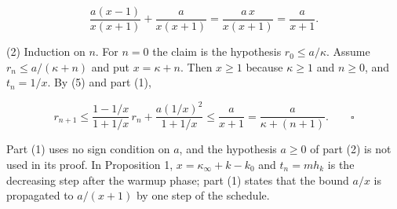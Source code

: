\documentclass[11pt,a4paper]{report}
\begin{document}
\[\frac{a(x-1)}{x(x+1)}+\frac a{x(x+1)}=\frac{a\,x}{x(x+1)}=\frac a{x+1}.\]


(2) Induction on \(n\). For \(n=0\) the claim is the hypothesis \(r_0\le a/\kappa\). Assume \(r_n\le a/(\kappa+n)\) and put \(x=\kappa+n\). Then \(x\ge1\) because \(\kappa\ge1\) and \(n\ge0\), and \(t_n=1/x\). By (5) and part (1),


\[r_{n+1}\le\frac{1-1/x}{1+1/x}\,r_n+\frac{a(1/x)^2}{1+1/x}\le\frac a{x+1}=\frac a{\kappa+(n+1)}.\qquad\square\]


Part (1) uses no sign condition on \(a\), and the hypothesis \(a\ge0\) of part (2) is not used in its proof. In Proposition 1, \(x=\kappa_\infty+k-k_0\) and \(t_n=mh_k\) is the decreasing step after the warmup phase; part (1) states that the bound \(a/x\) is propagated to \(a/(x+1)\) by one step of the schedule.
\end{document}
